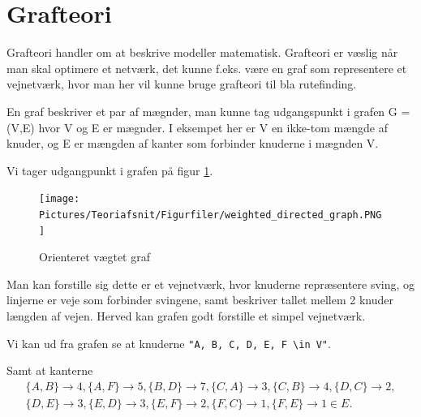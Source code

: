 \section{Grafteori}

Grafteori handler om at beskrive  modeller matematisk. Grafteori er væslig når man skal optimere et netværk, det kunne f.eks. være en graf som representere et vejnetværk, hvor man her vil kunne bruge grafteori til bla rutefinding.  

En graf beskriver et par af mægnder, man kunne tag udgangspunkt i grafen G = (V,E) hvor V og E er mægnder. I eksempet her er V en ikke-tom mængde af knuder, og E er mængden af kanter som forbinder knuderne i mægnden V. 

\vspace{5mm}

Vi tager udgangpunkt i grafen på figur \ref{fig:weighted-directed-graph}.

\begin{figure}[H]
\begin{adjustbox}{width=0.5\textwidth,center=\textwidth}
\centering
\texttt{[image: Pictures/Teoriafsnit/Figurfiler/weighted\_directed\_graph.PNG]}
\end{adjustbox}
\caption{Orienteret vægtet graf}
\label{fig:weighted-directed-graph}
\end{figure}

\vspace{5mm}

Man kan forstille sig dette er et vejnetværk, hvor knuderne repræsentere sving, og linjerne er veje som forbinder svingene, samt beskriver tallet mellem 2 knuder længden af vejen. Herved kan grafen godt forstille et simpel vejnetværk.

\vspace{5mm}

Vi kan ud fra grafen se at knuderne \verb!"A, B, C, D, E, F \in V"!. 

\vspace{5mm}

Samt at kanterne
\begin{equation}\label{grafteori}
\begin{split}
\{A,B\} \rightarrow 4, \{A,F\} \rightarrow 5, \{B,D\} \rightarrow 7, \{C,A\} \rightarrow 3, \{C,B\} \rightarrow 4, \{D,C\} \rightarrow 2, \\ 
\{D,E\} \rightarrow 3, \{E,D\} \rightarrow 3, \{E,F\} \rightarrow 2, \{F,C\} \rightarrow 1, \{F,E\} \rightarrow 1 \in E.
\end{split}
\end{equation}

